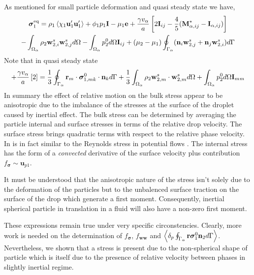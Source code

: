 As mentioned for small particle deformation and quasi steady state we have,  
\begin{multline*}
    \bm{\sigma}^\text{eq}_1 = 
    \rho_1\left<\chi_1\textbf{u}_1'\textbf{u}_1'\right> 
    + \phi_1 p_1 \textbf{I} 
    - \mu_1 \textbf{e} 
    + \frac{\gamma v_\alpha }{a} \left[
    2\textbf{I}_{ij} 
    - \frac{4 }{5} (\textbf{M}_{\alpha,ij}^* - \textbf{I}_{\alpha,ij})
    \right]\\
    - \int_{\Omega_{\alpha}} \rho_2 \textbf{w}_{2,i}^s\textbf{w}_{2,j}^s d\Omega
    - \int_{\Omega_{\alpha}} p_2^0 d\Omega \textbf{I}_{ij}
    + (\mu_2 - \mu_1)\oint_{\Gamma_{\alpha}} (\textbf{n}_i \textbf{w}_{2,j}^s + \textbf{n}_j \textbf{w}_{2,i}^s) d\Gamma
\end{multline*} 
Note that in quasi steady state 
\begin{equation*}
    + \frac{\gamma v_\alpha }{a} 
    \left[
    2
    \right]
    = 
    \frac{1}{3}\oint_{\Gamma_{\alpha}} \textbf{r}_m\cdot\bm\sigma_{1,mk}^0\cdot \textbf{n}_k d\Gamma 
    + \frac{1}{3}\int_{\Omega_{\alpha}} \rho_2 \textbf{w}_{2,m}^s\cdot \textbf{w}_{2,m}^s d\Omega
    + \int_{\Omega_{\alpha}} p_2^0 d\Omega \textbf{I}_{mm}
\end{equation*}
In summary the effect of relative motion on the bulk stress appear to be anisotropic due to the imbalance of the stresses at the surface of the droplet caused by inertial effect. 
The bulk stress can be determined by averaging the particle internal and surface stresses in terms of the relative drop velocity. 
The surface stress brings quadratic terms with respect to the relative phase velocity. 
In is in fact similar to the Reynolds stress in potential flows \citet{van1982bubble}. 
The internal stress has the form of a \textit{convected} derivative of the surface velocity plus contribution $f_{\bm\sigma} \sim \textbf{u}_{p 1}$. 

It must be understood that the anisotropic nature of the stress isn't solely due to the deformation of the particles but to the unbalenced surface traction on the surface of the drop which generate a first moment. 
Consequently, inertial spherical particle in translation in a fluid will also have a non-zero first moment.  

These expressions remain true under very specific circonstencies.
Clearly, more work is needed on the determination of $f_{\bm\sigma}$, $f_{\textbf{ww}}$ and $\left<\delta_{p} \oint_{\Gamma_{\alpha}} \textbf r \bm\sigma_1^0 \textbf{n}_2 d\Gamma\right>$.  
Nevertheless, we shown that a stress is present due to the non-spherical shape of particle which is itself due to the presence of relative velocity between phases in slightly inertial regime. 